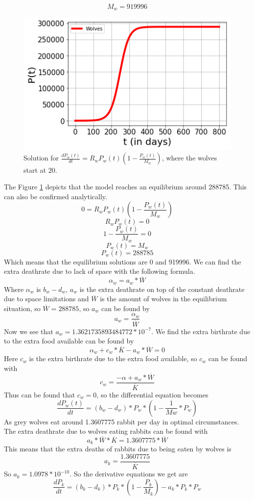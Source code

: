 \documentclass{article}
\begin{document}
$$M_w = 919996$$
\begin{figure}[h!]
    \centering
    \includegraphics[scale=0.78]{Pictures/Wolves.png}
    \caption{Solution for $\frac{dP_w(t)}{dt} = R_wP_w(t)(1-\frac{P_w(t)}{M_w})$, where the wolves start at $20$.}
    \label{fig:Wolves}
\end{figure}
The Figure \ref{fig:Wolves} depicts that the model reaches an equilibrium around 288785. This can also be confirmed analytically. 
$$0=R_wP_w(t)(1-\frac{P_w(t)}{M_w})$$
$$R_wP_w(t)=0$$
$$1-\frac{P_w(t)}{M_w}=0$$
$$P_w(t)=M_w$$
$$P_w(t)=288785$$
Which means that the equilibrium solutions are 0 and 919996. We can find the extra deathrate due to lack of space with the following formula.
$$\alpha_w = a_w*\overline{W}$$
Where $\alpha_w$ is $b_w-d_w$, $a_w$ is the extra deathrate on top of the constant deathrate due to space limitations and $\overline{W}$ is the amount of wolves in the equilibrium situation, so $\overline{W}=288785$, so $a_w$ can be found by
$$a_w = \frac{\alpha_w}{\overline{W}}$$
Now we see that $a_w=1.3621735893484772*10^{-7}$. We find the extra birthrate due to the extra food available can be found by
$$\alpha_w + c_w*\overline{K}-a_w*\overline{W}=0$$
Here $c_w$ is the extra birthrate due to the extra food available, so $c_w$ can be found with
$$c_w=\frac{-\alpha+a_w*\overline{W}}{\overline{K}}$$
Thus can be found that $c_w=0$, so the differential equation becomes
$$\frac{dP_w(t)}{dt}=(b_w-d_w)*P_w*(1-\frac{1}{Mw}*P_w)$$
As grey wolves eat around 1.3607775 rabbit per day in optimal circumstances. The extra deathrate due to wolves eating rabbits can be found with
$$a_k*\overline{W}*\overline{K}=1.3607775*\overline{W}$$
This means that the extra deaths of rabbits due to being eaten by wolves is 
$$a_k=\frac{1.3607775}{\overline{K}}$$
So $a_k=1.0978*10^{-10}$. So the derivative equations we get are
$$\frac{dP_k}{dt}=(b_k-d_k)*P_k*(1-\frac{P_k}{M_k})-a_k*P_k*P_w$$
\end{document}

